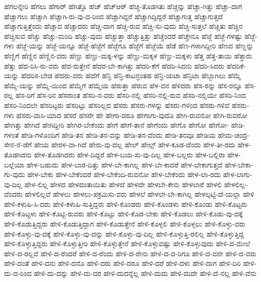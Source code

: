 {ಹೆಗಲನ್ನೇರಿ
ಹೆಗಲು
ಹೆಗಾರ್
ಹೆಗಿತ್ತೊ
ಹೆಚ್
ಹೆಚ್ಆರ್
ಹೆಚ್ಚ-ತೊಡಗಿತು
ಹೆಚ್ಚನ್ನು
ಹೆಚ್ಚಾ-ಗಿತ್ತು
ಹೆಚ್ಚಾ-ದಾಗ
ಹೆಚ್ಚಾಗಲು
ಹೆಚ್ಚಾಗಿ
ಹೆಚ್ಚಾಗಿ-ರು-ವು-ದ-ರಿಂದ
ಹೆಚ್ಚಾಗಿದ್ದರೆ
ಹೆಚ್ಚಾಗಿದ್ದಿದ್ದರೆ
ಹೆಚ್ಚಾಗುತ್ತ
ಹೆಚ್ಚಾಗುತ್ತದೆ
ಹೆಚ್ಚಾಗುತ್ತಿತ್ತೆಂದು
ಹೆಚ್ಚಾದ
ಹೆಚ್ಚಾದರು
ಹೆಚ್ಚಿ-ದಾಗ
ಹೆಚ್ಚಿ-ರುವ
ಹೆಚ್ಚಿ-ಸು-ವುದು
ಹೆಚ್ಚಿ-ಸುತ್ತಲೆ
ಹೆಚ್ಚಿತು
ಹೆಚ್ಚಿನ
ಹೆಚ್ಚಿಸುವ
ಹೆಚ್ಚು
ಹೆಚ್ಚು-ಮಂದಿ
ಹೆಚ್ಚು-ವುದು
ಹೆಚ್ಚುತ್ತಾ
ಹೆಚ್ಚುತ್ತಿತ್ತು
ಹೆಚ್ಚೆಂದರೆ
ಹೆಚ್ಚೇನೂ
ಹೆಜ್ಜೆ
ಹೆಜ್ಜೆ-ಗಳಷ್ಟು
ಹೆಜ್ಜೆ-ಗಳು
ಹೆಜ್ಜೆ-ಯನ್ನು
ಹೆಜ್ಜೆ-ಯನ್ನೂ
ಹೆಜ್ಜೆ-ಹೆಜ್ಜೆಗೆ
ಹೆಜ್ಜೆಗೂ
ಹೆಜ್ಜೆಗೆ
ಹೆಜ್ಜೆಯೆ
ಹೆಡೆ
ಹೆಣ-ಗಳಾಗಿದ್ದೀರಿ
ಹೆಣದ
ಹೆಣ್ಣನ್ನು
ಹೆಣ್ಣಿಗೆ
ಹೆಣ್ಣಿನ
ಹೆಣ್ಣಿನ-ವರು
ಹೆಣ್ಣು
ಹೆಣ್ಣು-ಮಕ್ಕ-ಳನ್ನು
ಹೆಣ್ಣು-ಮಕ್ಕಳ
ಹೆಣ್ಣು-ಮಕ್ಕಳು
ಹೆತ್ತ
ಹೆತ್ತ-ತಾಯಿ
ಹೆತ್ತಾರು
ಹೆತ್ತು
ಹೆದ-ರಿಸಿ-ರು-ವರು
ಹೆದ-ರುತ್ತೇನೆ
ಹೆದರ-ಬೇ-ಕಾಗಿತ್ತು
ಹೆದರಿ-ಕೆಗೆ
ಹೆದರಿ-ಸಿದನು
ಹೆದರಿ-ಸಿದರು
ಹೆದರಿಕೆ-ಯನ್ನು
ಹೆದರಿಸ-ಬೇಡ
ಹೆದರು-ವರು
ಹೆದೆಗೆ
ಹೆನ್ರಿ
ಹೆನ್ರಿ-ಕಾಟನ್ರಂತಹ
ಹೆನ್ರಿ-ಯಟಾ
ಹೆನ್ರಿಟಾ
ಹೆಬ್ಬಾಗಿಲು
ಹೆಮ್ಮೆ
ಹೆಮ್ಮೆ-ಯನ್ನು
ಹೆಮ್ಮೆ-ಯಿಂದ
ಹೆಮ್ಮೆಗೆ
ಹೆಮ್ಮೆಯ
ಹೆರುತ್ತಾ
ಹೆರುವ
ಹೆಳ-ವನ
ಹೆಳಿದರು
ಹೆಸ-ರನ್ನು
ಹೆಸ-ರನ್ನೂ
ಹೆಸ-ರಲ್ಲ
ಹೆಸ-ರಿಗೆ
ಹೆಸ-ರಿನ
ಹೆಸರಾಂತ
ಹೆಸರಿ-ನ-ವರು
ಹೆಸರಿ-ನಲ್ಲಿ
ಹೆಸರಿ-ನಲ್ಲಿ-ರುವ
ಹೆಸರಿ-ನಲ್ಲಿಯೇ
ಹೆಸರಿ-ನಿಂದ
ಹೆಸರಿ-ನಿಂದಲೇ
ಹೆಸರಿಟ್ಟರು
ಹೆಸರಿಟ್ಟು
ಹೆಸರಿಲ್ಲದ
ಹೆಸರು
ಹೆಸರು-ಗಳನ್ನು
ಹೆಸರು-ಗಳಿಂದ
ಹೆಸರು-ಗಳಿವೆ
ಹೆಸರು-ಗಳು
ಹೆಸರು-ವಾಸಿ-ಯಾದ
ಹೆಸರೆ
ಹೆಸರೇ
ಹೇ
ಹೇಗಾ-ದರೂ
ಹೇಗಾಗು-ವುದೊ
ಹೇಗಿ-ರುವನೋ
ಹೇಗಿ-ರುವರೋ
ಹೇಗಿತ್ತು
ಹೇಗಿದೆ
ಹೇಗಿದ್ದೀರಿ
ಹೇಗಿರ-ಬೇಕೆಂದು
ಹೇಗೆ
ಹೇಗೆ-ತಾನೆ
ಹೇಗೆಂದು
ಹೇಗೊ
ಹೇಗೋ
ಹೇಗೋ-
ಹೇಡಿ-ಗಳಂತೆ
ಹೇಡಿ-ಗಳೊಂದಿಗೆ
ಹೇಡಿ-ತನ
ಹೇಡಿ-ತನ-ವನ್ನು
ಹೇಡಿ-ತನ-ವೆಂದು
ಹೇಡಿ-ತನವೂ
ಹೇಡಿಯ
ಹೇಮ-ಚಂದ್ರ-ಸೇನ-ನೆ-ಡೆಗೆ
ಹೇಯ
ಹೇರಳ-ವಾ-ಗಿದೆ
ಹೇರು-ವು-ದಲ್ಲ
ಹೇಲ್
ಹೇಲ್ಸ್
ಹೇಳ-ಕೂಡ-ದೆಂದು
ಹೇಳ-ತೀ-ರದು
ಹೇಳ-ತೊಡಗಿದನು
ಹೇಳ-ತೊಡಗಿದರು
ಹೇಳ-ದಿದ್ದರೆ
ಹೇಳ-ಬಯ-ಸು-ವು-ದಿಲ್ಲ
ಹೇಳ-ಬಲ್ಲರು
ಹೇಳ-ಬಲ್ಲಿರಾ
ಹೇಳ-ಬಲ್ಲೆಯಾ
ಹೇಳ-ಬಹುದು
ಹೇಳ-ಬಾರ-ದಿತ್ತು
ಹೇಳ-ಬೇ-ಕಾಗಿಲ್ಲ
ಹೇಳ-ಬೇ-ಕಾದರೆ
ಹೇಳ-ಬೇಕಾಗುತ್ತದೆ
ಹೇಳ-ಬೇಕಾ-ಗು-ವುದು
ಹೇಳ-ಬೇಕು
ಹೇಳ-ಬೇಕೆಂದರೆ
ಹೇಳ-ಬೇಕೆಂದಿ-ರುವನೋ
ಹೇಳ-ಬೇಕೆಂದು
ಹೇಳ-ಲಾ-ರದು
ಹೇಳ-ಲಾಗು-ವು-ದಿಲ್ಲ
ಹೇಳ-ಲಿಲ್ಲ
ಹೇಳದ
ಹೇಳದಂತಾಯಿತು
ಹೇಳದೆ
ಹೇಳದೇ
ಹೇಳಬೇ-ಕೇನು
ಹೇಳಲಾರೆ
ಹೇಳಲಿ
ಹೇಳಲಿಲ್ಲ-ವೆಂದರು
ಹೇಳಲಿಲ್ಲವೆ
ಹೇಳಲು
ಹೇಳಲು-ಪಕ್ರಮಿಸು-ವರು
ಹೇಳಲೆ
ಹೇಳಲೇ-ಬೇ-ಕಾಗಿಲ್ಲ
ಹೇಳಲ್ಪಟ್ಟಿ-ದೆ-ಯಲ್ಲಾ
ಹೇಳಿ
ಹೇಳಿ-ಕಳುಹಿ-ಸಿ-ದರು
ಹೇಳಿ-ಕಳುಹಿ-ಸುತ್ತಿದ್ದರು
ಹೇಳಿ-ಕೊಂಡರು
ಹೇಳಿ-ಕೊಂಡಳು
ಹೇಳಿ-ಕೊಂಡು
ಹೇಳಿ-ಕೊಟ್ಟರು
ಹೇಳಿ-ಕೊಟ್ಟಳು
ಹೇಳಿ-ಕೊಟ್ಟಿ-ರುವರು
ಹೇಳಿ-ಕೊಟ್ಟು
ಹೇಳಿ-ಕೊಡ-ಬೇಕು
ಹೇಳಿ-ಕೊಡಲು
ಹೇಳಿ-ಕೊಡು-ವು-ದಕ್ಕೆ
ಹೇಳಿ-ಕೊಡುತ್ತಿದ್ದರು
ಹೇಳಿ-ಕೊಡುತ್ತಿದ್ದಾಗ
ಹೇಳಿ-ಕೊಡುತ್ತೇನೆ
ಹೇಳಿ-ಕೊಳ್ಳಲಿ
ಹೇಳಿ-ಕೊಳ್ಳಲು
ಹೇಳಿ-ಕೊಳ್ಳು-ವರು
ಹೇಳಿ-ಕೊಳ್ಳು-ವು-ದಕ್ಕೆ
ಹೇಳಿ-ಕೊಳ್ಳು-ವು-ದನ್ನು
ಹೇಳಿ-ಕೊಳ್ಳು-ವು-ದಿಲ್ಲ
ಹೇಳಿ-ಕೊಳ್ಳುತ್ತಿ-ರಲಿಲ್ಲ
ಹೇಳಿ-ಕೊಳ್ಳುತ್ತಿದ್ದ
ಹೇಳಿ-ಕೊಳ್ಳುತ್ತಿದ್ದರು
ಹೇಳಿ-ಕೊಳ್ಳುತ್ತೀರಿ
ಹೇಳಿ-ಕೊಳ್ಳುತ್ತೇನೆ
ಹೇಳಿ-ಕೊಳ್ಳುವಷ್ಟು
ಹೇಳಿ-ಕೊಳ್ಳುವುದು
ಹೇಳಿ-ದ-ಮೇಲೆ
ಹೇಳಿ-ದ-ರಲ್ಲವೆ
ಹೇಳಿ-ದ-ರೆಂದರೆ
ಹೇಳಿ-ದ-ರೆಂದು
ಹೇಳಿ-ದ-ರೇನು
ಹೇಳಿ-ದ-ವ-ರಿಗೂ
ಹೇಳಿ-ದ-ವನೇ
ಹೇಳಿ-ದ-ವರು
ಹೇಳಿ-ದಂತೆ
ಹೇಳಿ-ದನು
ಹೇಳಿ-ದನೊ
ಹೇಳಿ-ದರು
ಹೇಳಿ-ದರೂ
ಹೇಳಿ-ದರೆ
ಹೇಳಿ-ದಳು
ಹೇಳಿ-ದಾಗ
ಹೇಳಿ-ದಿರಿ
ಹೇಳಿ-ದು-ದ-ರಿಂದ
ಹೇಳಿ-ದು-ದನ್ನು
ಹೇಳಿ-ದು-ದರ
ಹೇಳಿ-ದುದನ್ನೆಲ್ಲ
ಹೇಳಿ-ದುದು
ಹೇಳಿ-ದುದೇ
ಹೇಳಿ-ದೆ-ನಲ್ಲ
ಹೇಳಿ-ದೆನು
}
